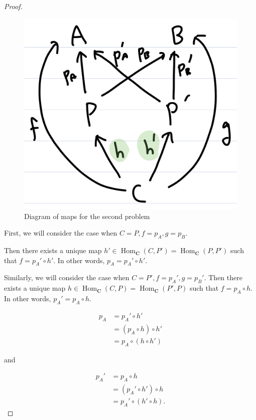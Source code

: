 \documentclass[12pt, psamsfonts]{amsart}
\theoremstyle{definition}
\theoremstyle{remark}
\DeclareMathOperator{\Hom}{Hom}
\numberwithin{equation}{section}
\begin{document}
\begin{proof}
  \begin{figure}
    \includegraphics[width=\linewidth]{maps.jpeg}
      \caption{Diagram of maps for the second problem}
    \label{fig:maps}
  \end{figure}

  First, we will consider the case when $C = P, f = p_A, g = p_B$.

  Then there exists a unique map $h' \in \Hom_{\mathbf{C}}(C, P') = \Hom_{\mathbf{C}}(P, P')$ such that $f = p_A' \circ h'$.
  In other words, $p_A = p_A' \circ h'$.

  Similarly, we will consider the case when $C = P', f = p_A', g = p_B'$.
  Then there exists a unique map $h \in \Hom_{\mathbf{C}}(C, P) = \Hom_{\mathbf{C}}(P', P)$ such that $f = p_A \circ h$.
  In other words, $p_A' = p_A \circ h$.

  \begin{align*}
    p_A
      &= p_A' \circ h' \\
      &= (p_A \circ h) \circ h' \\
      &= p_A \circ (h \circ h')
  \end{align*}

  and 

  \begin{align*}
    p_A'
      &= p_A \circ h \\
      &= (p_A' \circ h') \circ h \\
      &= p_A' \circ (h' \circ h).
  \end{align*}


\end{proof}
\end{document}
